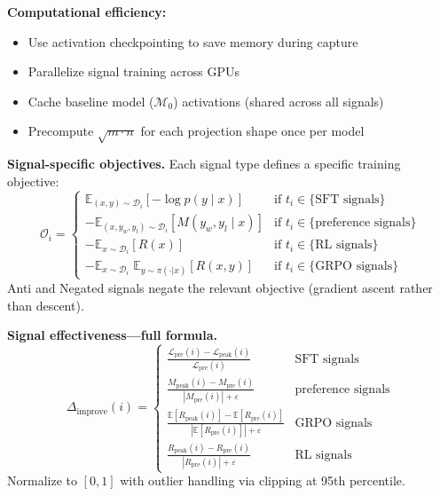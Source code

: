 \documentclass[11pt]{article}
\begin{document}
\noindent\textbf{Computational efficiency:}
\begin{itemize}[nosep]
\item Use activation checkpointing to save memory during capture
\item Parallelize signal training across GPUs
\item Cache baseline model ($\mathcal{M}_0$) activations (shared across all signals)
\item Precompute $\sqrt{m \cdot n}$ for each projection shape once per model
\end{itemize}

\noindent\textbf{Signal-specific objectives.} Each signal type defines a specific training objective:
\begin{equation}
\mathcal{O}_i = \begin{cases}
\mathbb{E}_{(x,y) \sim \mathcal{D}_i}\left[-\log p(y \mid x)\right] & \text{if } t_i \in \{\text{SFT signals}\} \\[0.5em]
-\mathbb{E}_{(x,y_w,y_l) \sim \mathcal{D}_i}\left[M(y_w, y_l \mid x)\right] & \text{if } t_i \in \{\text{preference signals}\} \\[0.5em]
-\mathbb{E}_{x \sim \mathcal{D}_i}\left[R(x)\right] & \text{if } t_i \in \{\text{RL signals}\} \\[0.5em]
-\mathbb{E}_{x \sim \mathcal{D}_i}\;\mathbb{E}_{y \sim \pi(\cdot|x)}\left[R(x,y)\right] & \text{if } t_i \in \{\text{GRPO signals}\}
\end{cases}
\end{equation}
Anti and Negated signals negate the relevant objective (gradient ascent rather than descent).

\noindent\textbf{Signal effectiveness---full formula.}
\begin{equation}
\Delta_{\text{improve}}(i) = \begin{cases}
\displaystyle\frac{\mathcal{L}_{\text{pre}}(i) - \mathcal{L}_{\text{peak}}(i)}{\mathcal{L}_{\text{pre}}(i)} & \text{SFT signals} \\[1em]
\displaystyle\frac{M_{\text{peak}}(i) - M_{\text{pre}}(i)}{|M_{\text{pre}}(i)| + \varepsilon} & \text{preference signals} \\[1em]
\displaystyle\frac{\mathbb{E}[R_{\text{peak}}(i)] - \mathbb{E}[R_{\text{pre}}(i)]}{|\mathbb{E}[R_{\text{pre}}(i)]| + \varepsilon} & \text{GRPO signals} \\[1em]
\displaystyle\frac{R_{\text{peak}}(i) - R_{\text{pre}}(i)}{|R_{\text{pre}}(i)| + \varepsilon} & \text{RL signals}
\end{cases}
\end{equation}
Normalize to $[0,1]$ with outlier handling via clipping at 95th percentile.
\end{document}
